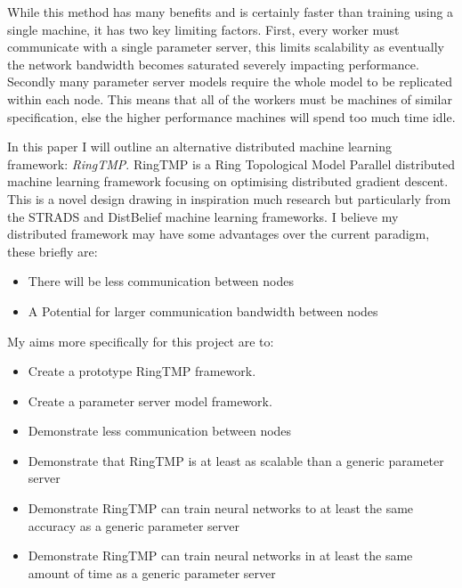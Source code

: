 While this method has many benefits and is certainly faster than training using
a single machine, it has two key limiting factors. First, every worker must
communicate with a single parameter server, this limits scalability as
eventually the network bandwidth becomes saturated severely impacting
performance. \cite{LI2014ParameterServers} Secondly many parameter server models
require the whole model to be replicated within each node.
\cite{jia2018BeyondData} This means that all of the workers must be machines of
similar specification, else the higher performance machines will spend too much
time idle.
\par
In this paper I will outline an alternative distributed machine learning
framework: \textit{RingTMP}. RingTMP is a Ring Topological Model Parallel
distributed machine learning framework focusing on optimising distributed
gradient descent. This is a novel design drawing in inspiration much research
but particularly from the STRADS and DistBelief machine learning frameworks.
\cite{kim2016STRADS,Dean2012Distbelief} I believe my distributed framework may
have some advantages over the current paradigm, these briefly are:
\begin{itemize}
    \item There will be less communication between nodes
    \item A Potential for larger communication bandwidth between nodes
\end{itemize}

My aims more specifically for this project are to:
\begin{itemize}
    \item Create a prototype RingTMP framework.
    \item Create a parameter server model framework.
    \item Demonstrate less communication between nodes
    \item Demonstrate that RingTMP is at least as scalable than a generic parameter
    server
    \item Demonstrate RingTMP can train neural networks to at least the same
    accuracy  as a generic parameter server
    \item Demonstrate RingTMP can train neural networks in at least the same
    amount of time as a generic parameter server
\end{itemize}

